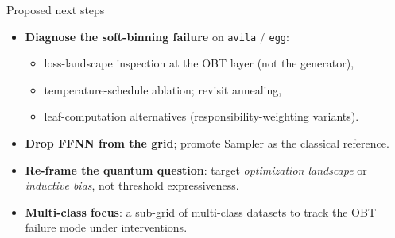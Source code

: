 \documentclass[aspectratio=169,10pt]{beamer}
\newcommand{\dataset}[1]{\texttt{#1}}
\begin{document}
\begin{frame}{Proposed next steps}
  \begin{itemize}
    \item \textbf{Diagnose the soft-binning failure} on \dataset{avila} / \dataset{egg}:
          \begin{itemize}
            \item loss-landscape inspection at the OBT layer (not the generator),
            \item temperature-schedule ablation; revisit annealing,
            \item leaf-computation alternatives (responsibility-weighting variants).
          \end{itemize}
    \item \textbf{Drop FFNN from the grid}; promote Sampler as the classical reference.
    \item \textbf{Re-frame the quantum question}: target \emph{optimization landscape} or
          \emph{inductive bias}, not threshold expressiveness.
    \item \textbf{Multi-class focus}: a sub-grid of multi-class datasets to track the OBT
          failure mode under interventions.
  \end{itemize}
\end{frame}
\end{document}
